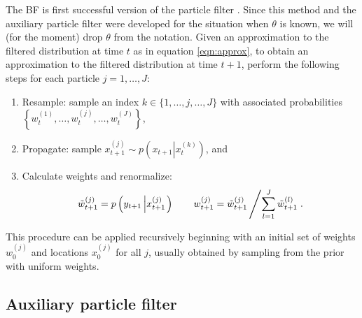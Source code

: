 The BF is first successful version of the particle filter \citep{Gord:Salm:Smit:nove:1993,Kita:mont:1996}. Since this method and the auxiliary particle filter were developed for the situation when $\theta$ is known, we will (for the moment) drop $\theta$ from the notation. Given an approximation to the filtered distribution at time $t$ as in equation \eqref{eqn:approx}, to obtain an approximation to the filtered distribution at time $t+1$, perform the following steps for each particle $j=1,\ldots,J$:
\begin{enumerate}
\item Resample: sample an index $k\in\{1,\ldots,j,\ldots,J\}$ with associated probabilities $\left\{w_t^{(1)},\ldots,w_t^{(j)},\ldots,w_t^{(J)}\right\}$,
\item Propagate: sample $x_{t+1}^{(j)} \sim p\left( x_{t+1}\left|x_t^{(k)}\right.\right)$, and
\item Calculate weights and renormalize:
\[ \tilde{w}_{t+1}^{(j)} = p\left(y_{t+1}\left|x_{t+1}^{(j)}\right.\right) \qquad w_{t+1}^{(j)} = \tilde{w}_{t+1}^{(j)}\left/ \sum_{l=1}^J \tilde{w}_{t+1}^{(l)} \right. .\]
\end{enumerate}
This procedure can be applied recursively beginning with an initial set of weights $w_0^{(j)}$ and locations $x_0^{(j)}$ for all $j$, usually obtained by sampling from the prior with uniform weights.

\subsection{Auxiliary particle filter \label{sec:apf}}

